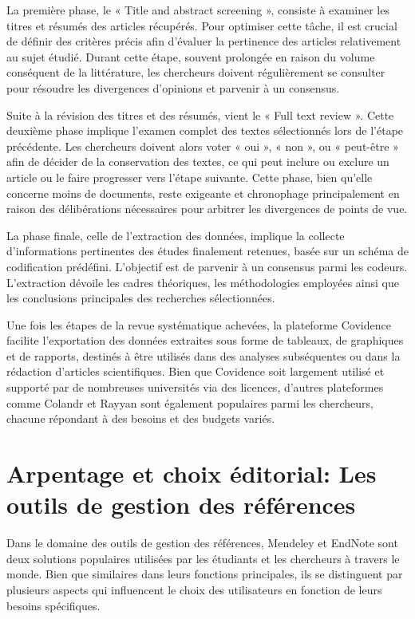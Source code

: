 \documentclass[
  letterpaper,
  DIV=11,
  numbers=noendperiod]{scrreprt}
\begin{document}
La première phase, le « Title and abstract screening », consiste à
examiner les titres et résumés des articles récupérés. Pour optimiser
cette tâche, il est crucial de définir des critères précis afin
d'évaluer la pertinence des articles relativement au sujet étudié.
Durant cette étape, souvent prolongée en raison du volume conséquent de
la littérature, les chercheurs doivent régulièrement se consulter pour
résoudre les divergences d'opinions et parvenir à un consensus.

Suite à la révision des titres et des résumés, vient le « Full text
review ». Cette deuxième phase implique l'examen complet des textes
sélectionnés lors de l'étape précédente. Les chercheurs doivent alors
voter « oui », « non », ou « peut-être » afin de décider de la
conservation des textes, ce qui peut inclure ou exclure un article ou le
faire progresser vers l'étape suivante. Cette phase, bien qu'elle
concerne moins de documents, reste exigeante et chronophage
principalement en raison des délibérations nécessaires pour arbitrer les
divergences de points de vue.

La phase finale, celle de l'extraction des données, implique la collecte
d'informations pertinentes des études finalement retenues, basée sur un
schéma de codification prédéfini. L'objectif est de parvenir à un
consensus parmi les codeurs. L'extraction dévoile les cadres théoriques,
les méthodologies employées ainsi que les conclusions principales des
recherches sélectionnées.

Une fois les étapes de la revue systématique achevées, la plateforme
Covidence facilite l'exportation des données extraites sous forme de
tableaux, de graphiques et de rapports, destinés à être utilisés dans
des analyses subséquentes ou dans la rédaction d'articles scientifiques.
Bien que Covidence soit largement utilisé et supporté par de nombreuses
universités via des licences, d'autres plateformes comme Colandr et
Rayyan sont également populaires parmi les chercheurs, chacune répondant
à des besoins et des budgets variés.

\hypertarget{arpentage-et-choix-uxe9ditorial-les-outils-de-gestion-des-ruxe9fuxe9rences}{%
\section{Arpentage et choix éditorial: Les outils de gestion des
références}\label{arpentage-et-choix-uxe9ditorial-les-outils-de-gestion-des-ruxe9fuxe9rences}}

Dans le domaine des outils de gestion des références, Mendeley et
EndNote sont deux solutions populaires utilisées par les étudiants et
les chercheurs à travers le monde. Bien que similaires dans leurs
fonctions principales, ils se distinguent par plusieurs aspects qui
influencent le choix des utilisateurs en fonction de leurs besoins
spécifiques.
\end{document}
